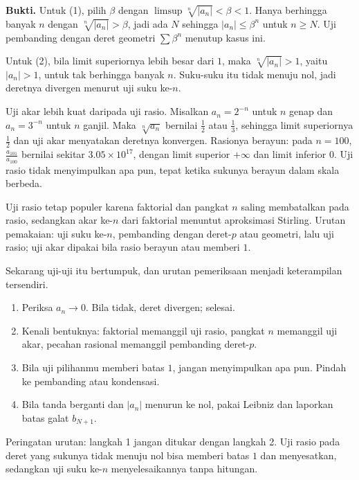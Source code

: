 \noindent\textbf{Bukti.} Untuk (1), pilih $\beta$ dengan $\limsup \sqrt[n]{|a_n|} < \beta < 1$. Hanya
berhingga banyak $n$ dengan $\sqrt[n]{|a_n|} > \beta$, jadi ada $N$ sehingga
$|a_n| \le \beta^n$ untuk $n \ge N$. Uji pembanding dengan deret geometri
$\sum \beta^n$ menutup kasus ini.

Untuk (2), bila limit superiornya lebih besar dari $1$, maka
$\sqrt[n]{|a_n|} > 1$, yaitu $|a_n| > 1$, untuk tak berhingga banyak $n$. Suku-suku
itu tidak menuju nol, jadi deretnya divergen menurut uji suku ke-$n$.

Uji akar lebih kuat daripada uji rasio. Misalkan $a_n = 2^{-n}$ untuk $n$ genap dan
$a_n = 3^{-n}$ untuk $n$ ganjil. Maka $\sqrt[n]{a_n}$ bernilai $\tfrac{1}{2}$ atau
$\tfrac{1}{3}$, sehingga limit superiornya $\tfrac{1}{2}$ dan uji akar menyatakan
deretnya konvergen. Rasionya berayun: pada $n=100$, $\frac{a_{101}}{a_{100}}$ bernilai
sekitar $3.05 \times 10^{17}$, dengan limit superior $+\infty$ dan limit inferior $0$.
Uji rasio tidak menyimpulkan apa pun, tepat ketika sukunya berayun dalam skala berbeda.

Uji rasio tetap populer karena faktorial dan pangkat $n$ saling membatalkan pada
rasio, sedangkan akar ke-$n$ dari faktorial menuntut aproksimasi Stirling. Urutan
pemakaian: uji suku ke-$n$, pembanding dengan deret-$p$ atau geometri, lalu uji rasio;
uji akar dipakai bila rasio berayun atau memberi $1$.

Sekarang uji-uji itu bertumpuk, dan urutan pemeriksaan menjadi keterampilan tersendiri.

\begin{resep}
\begin{enumerate}
\item Periksa $a_n \to 0$. Bila tidak, deret divergen; selesai.
\item Kenali bentuknya: faktorial memanggil uji rasio, pangkat $n$ memanggil uji akar,
      pecahan rasional memanggil pembanding deret-$p$.
\item Bila uji pilihanmu memberi batas $1$, jangan menyimpulkan apa pun. Pindah ke
      pembanding atau kondensasi.
\item Bila tanda berganti dan $|a_n|$ menurun ke nol, pakai Leibniz dan laporkan batas
      galat $b_{N+1}$.
\end{enumerate}

Peringatan urutan: langkah 1 jangan ditukar dengan langkah 2. Uji rasio pada deret yang
sukunya tidak menuju nol bisa memberi batas $1$ dan menyesatkan, sedangkan uji suku
ke-$n$ menyelesaikannya tanpa hitungan.
\end{resep}

